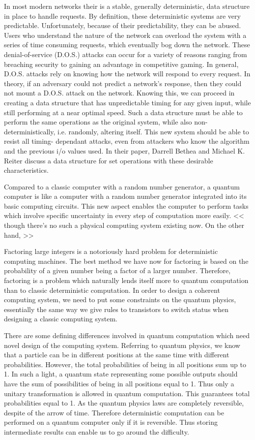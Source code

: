 \documentclass{paper}
\begin{document}
In most modern networks their is a stable, generally deterministic, data
structure in place to handle requests. By definition, these
deterministic systems are very predictable. Unfortunately, because of their
predictability, they can be abused. Users who understand the nature of 
the network can overload the system with a series of time consuming
requests, which eventually bog down the network. These denial-of-service
(D.O.S.) attacks can occur for a variety of reasons ranging from 
breaching security to gaining an advantage in competitive gaming. In 
general, D.O.S. attacks rely on knowing how the network will respond to 
every request. In theory, if an adversary could not predict a network's 
response, then they could not mount a D.O.S. attack on the network. 
Knowing this, we can proceed in 
creating a data structure that has unpredictable timing 
for any given input, while still performing at a near optimal speed. 
Such a data structure must be able to perform the same operations as 
the original system, while also non-deterministically, i.e. randomly, 
altering itself. This new system should be able to resist all timing-
dependant attacks,
even from attackers who know the algorithm and the previous i/o values used.
In their paper, Darrell Bethea and Michael K. Reiter discuss a data
structure for set operations with these desirable characteristics.

Compared to a classic computer with a random number generator, a 
quantum computer is like a computer with a random number generator 
integrated into its basic computing circuits. This new aspect enables 
the computer to perform tasks which involve specific uncertainty in every
step of computation more easily. << though there's no such a physical 
computing system existing now. On the other hand, >> 

Factoring large  integers is a notoriously hard problem for deterministic 
computing machines. The best method we have now  for factoring is based 
on the probability of a given number being a factor of a larger number. 
Therefore, factoring is a problem which naturally lends itself more to 
quantum computation than to classic deterministic computation. In order to design a coherent computing system, we need to
put some constraints on the quantum physics, essentially the same way we
give rules to transistors to switch status when designing a classic 
computing system.

There are some defining differences involved in quantum computation
which need novel design of the computing system. Referring to quantum
physics, we know that a particle can be in 
different positions at the same time with different probabilities. 
However, the total probabilities of being in all positions sum up to 1. 
In such a light, a quantum state representing some possible outputs
should have the sum of possibilities of being in all positions equal to
1. Thus only a unitary transformation is allowed in quantum computation.
This guarantees total probabilities equal to 1. As the quantum physics 
laws are completely reversible, despite of the
arrow of time. Therefore deterministic computation can be performed on
a quantum computer only if it is reversible. Thus storing intermediate
results can enable us to go around the difficulty.
\end{document}
